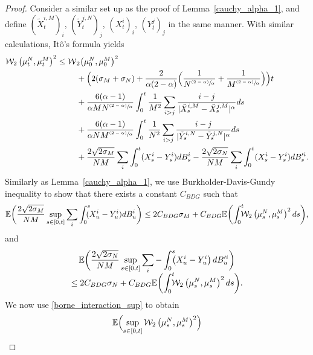 \documentclass[10pt]{amsart}
\newcommand{\psfrac}[2]{\sfrac{(#1)}{#2}}
\theoremstyle{plain}
\theoremstyle{definition}
\begin{document}
\begin{proof}
Consider a similar set up as the proof of Lemma~\ref{cauchy_alpha_1}, and define $(\tilde{X}^{i,M}_t)_i$, $(\tilde{Y}^{j,N}_t)_j$, $(X^{i}_t)_i$, $(Y^{j}_t)_j$ in the same manner. With similar calculations, Itô's formula yields\vspace*{-5pt}
\begin{align*}
\mathcal{W}_2\left(\mu_t^N,\mu_t^M\right)^2\leq \mathcal{W}&_2\bigl(\mu_0^N,\mu_0^M\bigr)^2\\
&+\Bigl(2(\sigma_M+\sigma_N)+\frac{2}{\alpha(2-\alpha)}\Bigl(\frac{1}{N^{\psfrac{2-\alpha}{\alpha}}}+\frac{1}{M^{\psfrac{2-\alpha}{\alpha}}}\Bigr)\Bigr)t\\
&+\frac{6(\alpha-1)}{\alpha MN^{\psfrac{2-\alpha}{\alpha}}}\int_{0}^t\frac{1}{M^2}\sum_{i>j}\frac{i-j}{|\tilde{X}^{i,M}_s-\tilde{X}^{j,M}_s|^{\alpha}}ds\\
&+\frac{6(\alpha-1)}{\alpha NM^{\psfrac{2-\alpha}{\alpha}}}\int_{0}^t\frac{1}{N^2}\sum_{i>j}\frac{i-j}{|\tilde{Y}^{i,N}_s-\tilde{Y}^{j,N}_s|^{\alpha}}ds\\
&+\frac{2\sqrt{2\sigma_M}}{NM}\sum_i\int_0^t(X^i_s-Y^i_s)dB^i_s-\frac{2\sqrt{2\sigma_N}}{NM}\sum_i\int_0^t(X^i_s-Y^i_s)dB'^i_s.
\end{align*}
Similarly as Lemma~\ref{cauchy_alpha_1}, we use Burkholder-Davis-Gundy inequality to show that there exists a constant $C_{BDG}$ such that\vspace*{-3pt}
\[
\mathbb{E}\biggl(\frac{2\sqrt{2\sigma_M}}{NM}\sup_{s\in[0,t]}\sum_i\int_0^s\hspace*{-2mm}(X^i_u-Y^i_u)dB^{i}_u\biggr)\\
\leq2C_{BDG}\sigma_M+C_{BDG}\mathbb{E}\biggl(\int_0^t\hspace*{-2mm}\mathcal{W}_2\left(\mu_s^N,\mu_s^M\right)^2ds\biggr),
\]
and\vspace*{-5pt}
\begin{multline*}
\mathbb{E}\biggl(\frac{2\sqrt{2\sigma_N}}{NM}\sup_{s\in[0,t]}\sum_i-\int_0^s\hspace*{-2mm}\left(X^i_u-Y^i_u\right)dB'^{i}_u\biggr)\\[-5pt]
\leq2C_{BDG}\sigma_N+C_{BDG}\mathbb{E}\biggl(\int_0^t\hspace*{-2mm}\mathcal{W}_2\left(\mu_s^N,\mu_s^M\right)^2ds\biggr).
\end{multline*}
We now use \eqref{borne_interaction_sup} to obtain\vspace*{-3pt}
\begin{align*}
\mathbb{E}&\Bigl(\sup_{s\in[0,t]}\mathcal{W}_2\left(\mu_s^N,\mu_s^M\right)^2\Bigr)\\

\end{align*}
\end{proof}
\end{document}
